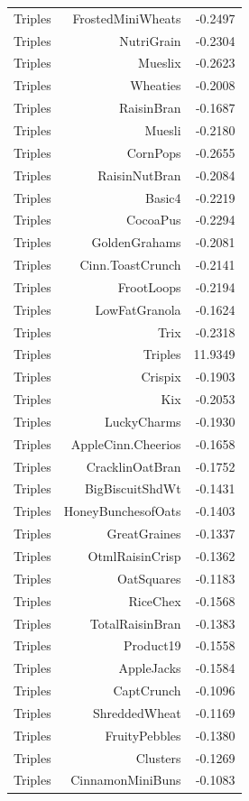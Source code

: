 \begin{longtable}{@{}lrr@{}}
Triples & FrostedMiniWheats & -0.2497 \\
Triples & NutriGrain & -0.2304 \\
Triples & Mueslix & -0.2623 \\
Triples & Wheaties & -0.2008 \\
Triples & RaisinBran & -0.1687 \\
Triples & Muesli & -0.2180 \\
Triples & CornPops & -0.2655 \\
Triples & RaisinNutBran & -0.2084 \\
Triples & Basic4 & -0.2219 \\
Triples & CocoaPus & -0.2294 \\
Triples & GoldenGrahams & -0.2081 \\
Triples & Cinn.ToastCrunch & -0.2141 \\
Triples & FrootLoops & -0.2194 \\
Triples & LowFatGranola & -0.1624 \\
Triples & Trix & -0.2318 \\
Triples & Triples & 11.9349 \\
Triples & Crispix & -0.1903 \\
Triples & Kix & -0.2053 \\
Triples & LuckyCharms & -0.1930 \\
Triples & AppleCinn.Cheerios & -0.1658 \\
Triples & CracklinOatBran & -0.1752 \\
Triples & BigBiscuitShdWt & -0.1431 \\
Triples & HoneyBunchesofOats & -0.1403 \\
Triples & GreatGraines & -0.1337 \\
Triples & OtmlRaisinCrisp & -0.1362 \\
Triples & OatSquares & -0.1183 \\
Triples & RiceChex & -0.1568 \\
Triples & TotalRaisinBran & -0.1383 \\
Triples & Product19 & -0.1558 \\
Triples & AppleJacks & -0.1584 \\
Triples & CaptCrunch & -0.1096 \\
Triples & ShreddedWheat & -0.1169 \\
Triples & FruityPebbles & -0.1380 \\
Triples & Clusters & -0.1269 \\
Triples & CinnamonMiniBuns & -0.1083 \\

\end{longtable}
